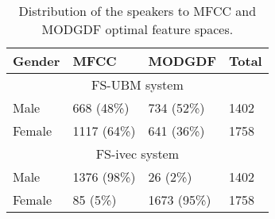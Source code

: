 \documentclass[preprint,12pt,5p]{elsarticle}
\begin{document}
\begin{table}[h]
\centering
\caption{Distribution of the speakers to MFCC and MODGDF optimal feature spaces.}
\begin{tabular}{|l|l|l|l|}
\hline
Gender & MFCC & MODGDF & Total \\
\hline
\multicolumn{4}{|c|}{FS-UBM system}\\
\hline
Male & 668 (48\%) & 734 (52\%) & 1402 \\
Female & 1117 (64\%) & 641 (36\%) & 1758 \\
\hline
\multicolumn{4}{|c|}{FS-ivec system}\\
\hline
Male & 1376 (98\%)& 26 (2\%)& 1402 \\
Female & 85 (5\%) & 1673 (95\%) & 1758 \\
\hline
\end{tabular}
\label{tab:optFeat}
\end{table}
\end{document}
